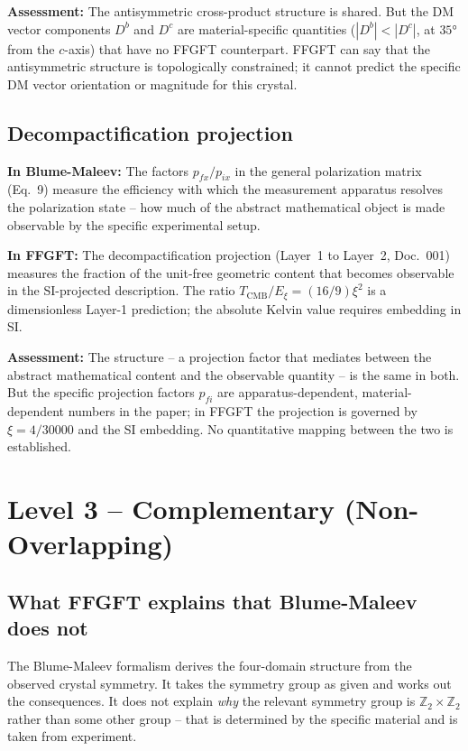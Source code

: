 \textbf{Assessment:} The antisymmetric cross-product structure is shared.
But the DM vector components $D^b$ and $D^c$ are material-specific quantities
($|D^b| < |D^c|$, at $35°$ from the $c$-axis) that have no FFGFT counterpart.
FFGFT can say that the antisymmetric structure is topologically constrained;
it cannot predict the specific DM vector orientation or magnitude for this
crystal.

\subsection{Decompactification projection}

\textbf{In Blume-Maleev:} The factors $p_{fx}/p_{ix}$ in the general
polarization matrix (Eq.~9) measure the efficiency with which the measurement
apparatus resolves the polarization state -- how much of the abstract
mathematical object is made observable by the specific experimental setup.

\textbf{In FFGFT:} The decompactification projection (Layer~1 to Layer~2,
Doc.~001) measures the fraction of the unit-free geometric content that
becomes observable in the SI-projected description. The ratio
$T_{\mathrm{CMB}}/E_\xi = (16/9)\xi^2$ is a dimensionless Layer-1 prediction;
the absolute Kelvin value requires embedding in SI.

\textbf{Assessment:} The structure -- a projection factor that mediates
between the abstract mathematical content and the observable quantity -- is
the same in both. But the specific projection factors $p_{fi}$ are
apparatus-dependent, material-dependent numbers in the paper; in FFGFT the
projection is governed by $\xi = 4/30000$ and the SI embedding. No
quantitative mapping between the two is established.

\section{Level 3 -- Complementary (Non-Overlapping)}

\subsection{What FFGFT explains that Blume-Maleev does not}

The Blume-Maleev formalism derives the four-domain structure from the
observed crystal symmetry. It takes the symmetry group as given and
works out the consequences. It does not explain \emph{why} the relevant
symmetry group is $\mathbb{Z}_2\times\mathbb{Z}_2$ rather than some other
group -- that is determined by the specific material and is taken from
experiment.


